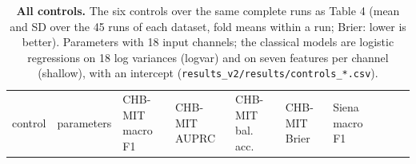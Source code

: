 \documentclass[11pt,a4paper]{article}
\begin{document}
\endgroup

\begin{landscape}\begingroup\footnotesize

\begin{longtable}[]{@{}
  >{\raggedright\arraybackslash}p{}
  >{\raggedright\arraybackslash}p{}
  >{\raggedright\arraybackslash}p{}
  >{\raggedright\arraybackslash}p{}
  >{\raggedright\arraybackslash}p{}
  >{\raggedright\arraybackslash}p{}
  >{\raggedright\arraybackslash}p{}
  >{\raggedright\arraybackslash}p{}
  >{\raggedright\arraybackslash}p{}
  >{\raggedright\arraybackslash}p{}@{}}
\caption{\textbf{All controls.} The six controls over the same complete runs as Table 4 (mean and SD over the 45 runs of each dataset, fold means within a run; Brier: lower is better). Parameters with 18 input channels; the classical models are logistic regressions on 18 log variances (logvar) and on seven features per channel (shallow), with an intercept (\nolinkurl{results_v2/results/controls_*.csv}).}\tabularnewline
\toprule\noalign{}
\begin{minipage}[b]{\linewidth}\raggedright
control
\end{minipage} & \begin{minipage}[b]{\linewidth}\raggedright
parameters
\end{minipage} & \begin{minipage}[b]{\linewidth}\raggedright
CHB-MIT macro F1
\end{minipage} & \begin{minipage}[b]{\linewidth}\raggedright
CHB-MIT AUPRC
\end{minipage} & \begin{minipage}[b]{\linewidth}\raggedright
CHB-MIT bal. acc.
\end{minipage} & \begin{minipage}[b]{\linewidth}\raggedright
CHB-MIT Brier
\end{minipage} & \begin{minipage}[b]{\linewidth}\raggedright
Siena macro F1
\end{minipage} & \begin{minipage}[b]{\linewidth}\raggedright

\end{minipage}
\end{longtable}
\end{landscape}
\end{document}
